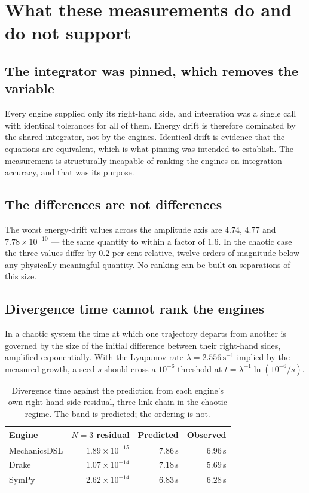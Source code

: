\documentclass[review,12pt]{elsarticle}
\begin{document}
\section{What these measurements do and do not support}

\subsection{The integrator was pinned, which removes the variable}
Every engine supplied only its right-hand side, and integration was a single
call with identical tolerances for all of them. Energy drift is therefore
dominated by the shared integrator, not by the engines. Identical drift is
evidence that the equations are equivalent, which is what pinning was intended
to establish. The measurement is structurally incapable of ranking the engines
on integration accuracy, and that was its purpose.

\subsection{The differences are not differences}
The worst energy-drift values across the amplitude axis are $4.74$, $4.77$ and
$7.78\times10^{-10}$ --- the same quantity to within a factor of $1.6$. In the
chaotic case the three values differ by $0.2$ per cent relative, twelve orders
of magnitude below any physically meaningful quantity. No ranking can be built
on separations of this size.

\subsection{Divergence time cannot rank the engines}\label{sec:divergence}
In a chaotic system the time at which one trajectory departs from another is
governed by the size of the initial difference between their right-hand sides,
amplified exponentially. With the Lyapunov rate
$\lambda = 2.556\,\mathrm{s}^{-1}$ implied by the measured growth, a seed $s$
should cross a $10^{-6}$ threshold at
$t = \lambda^{-1}\ln(10^{-6}/s)$.

\begin{table}[!htbp]
\centering
\caption{Divergence time against the prediction from each engine's own
right-hand-side residual, three-link chain in the chaotic regime. The band is
predicted; the ordering is not.}
\label{tab:divergence}
\begin{tabular}{@{}lrrr@{}}
\toprule
\textbf{Engine} & \textbf{$N{=}3$ residual} & \textbf{Predicted} & \textbf{Observed} \\
\midrule
MechanicsDSL & $1.89\times10^{-15}$ & $7.86$\,s & $6.96$\,s \\
Drake        & $1.07\times10^{-14}$ & $7.18$\,s & $5.69$\,s \\
SymPy        & $2.62\times10^{-14}$ & $6.83$\,s & $6.28$\,s \\
\bottomrule
\end{tabular}
\end{table}
\end{document}
